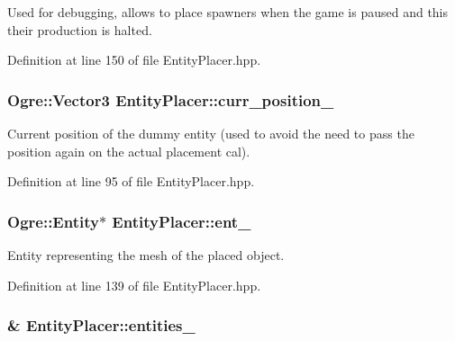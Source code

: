 Used for debugging, allows to place spawners when the game is paused and this their production is halted. 



Definition at line 150 of file Entity\+Placer.\+hpp.

\subsubsection[{\texorpdfstring{curr\+\_\+position\+\_\+}{curr_position_}}]{\setlength{\rightskip}{0pt plus 5cm}Ogre\+::\+Vector3 Entity\+Placer\+::curr\+\_\+position\+\_\+\hspace{0.3cm}{\ttfamily [private]}}\hypertarget{class_entity_placer_a27b04e112365310f41af57bc764fc595}{}\label{class_entity_placer_a27b04e112365310f41af57bc764fc595}


Current position of the dummy entity (used to avoid the need to pass the position again on the actual placement cal). 



Definition at line 95 of file Entity\+Placer.\+hpp.

\subsubsection[{\texorpdfstring{ent\+\_\+}{ent_}}]{\setlength{\rightskip}{0pt plus 5cm}Ogre\+::\+Entity$\ast$ Entity\+Placer\+::ent\+\_\+\hspace{0.3cm}{\ttfamily [private]}}\hypertarget{class_entity_placer_ae0452120158b3f88eba7b913257f185a}{}\label{class_entity_placer_ae0452120158b3f88eba7b913257f185a}


Entity representing the mesh of the placed object. 



Definition at line 139 of file Entity\+Placer.\+hpp.

\subsubsection[{\texorpdfstring{entities\+\_\+}{entities_}}]{\& Entity\+Placer\+::entities\+\_\+\hspace{0.3cm}{\ttfamily [private]}}\hypertarget{class_entity_placer_ae9fd5bc815ebbfd3edaeda50c3514db6}{}\label{class_entity_placer_ae9fd5bc815ebbfd3edaeda50c3514db6}


